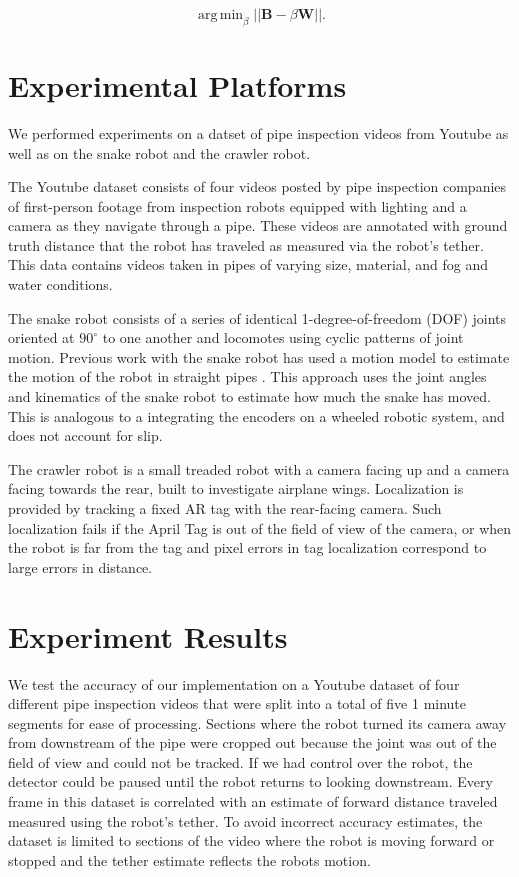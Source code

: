 \documentclass[letterpaper, 10 pt, conference]{ieeeconf}
\DeclareMathOperator*{\argmin}{arg\,min}
\begin{document}
\begin{equation}
	\argmin_{\beta} ||\textbf{B} - \beta \textbf{W} ||.
\end{equation}


\section{Experimental Platforms} \label{section:Experimental Platforms}

We performed experiments on a datset of pipe inspection videos from Youtube as well as on the snake robot and the crawler robot.

The Youtube dataset consists of four videos \cite{pipevideo2, pipevideo4, pipevideo5, pipevideo6} posted by pipe inspection companies of first-person footage from inspection robots equipped with lighting and a camera as they navigate through a pipe. These videos are annotated with ground truth distance that the robot has traveled as measured via the robot's tether. This data contains videos taken in pipes of varying size, material, and fog and water conditions.

The snake robot \cite{Wright2012} consists of a series of identical 1-degree-of-freedom (DOF) joints oriented at $90^{\circ}$ to one another and locomotes using cyclic patterns of joint motion. Previous work with the snake robot has used a motion model \cite{Enner2012} to estimate the motion of the robot in straight pipes \cite{Enner2013}. This approach uses the joint angles and kinematics of the snake robot to estimate how much the snake has moved. This is analogous to a integrating the encoders on a wheeled robotic system, and does not account for slip.

The crawler robot is a small treaded robot with a camera facing up and a camera facing towards the rear, built to investigate airplane wings. Localization is provided by tracking a fixed AR tag with the rear-facing camera. Such localization fails if the April Tag is out of the field of view of the camera, or when the robot is far from the tag and pixel errors in tag localization correspond to large errors in distance.

\section{Experiment Results}

We test the accuracy of our implementation on a Youtube dataset of four different pipe inspection videos that were split into a total of five 1 minute segments for ease of processing. Sections where the robot turned its camera away from downstream of the pipe were cropped out because the joint was out of the field of view and could not be tracked. If we had control over the robot, the detector could be paused until the robot returns to looking downstream. Every frame in this dataset is correlated with an estimate of forward distance traveled measured using the robot's tether. To avoid incorrect accuracy estimates, the dataset is limited to sections of the video where the robot is moving forward or stopped and the tether estimate reflects the robots motion.
\end{document}
